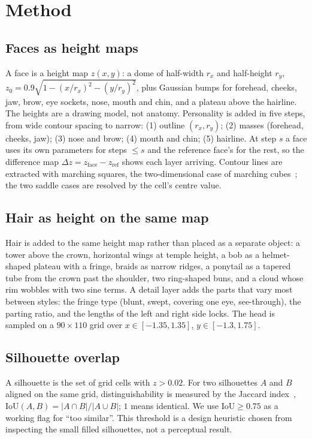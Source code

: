 \documentclass[11pt]{article}
\begin{document}
\section{Method}
\subsection{Faces as height maps}
A face is a height map $z(x,y)$: a dome of half-width $r_x$ and half-height $r_y$, $z_0 = 0.9\sqrt{1 - (x/r_x)^2 - (y/r_y)^2}$, plus Gaussian bumps for forehead, cheeks, jaw, brow, eye sockets, nose, mouth and chin, and a plateau above the hairline.
The heights are a drawing model, not anatomy.
Personality is added in five steps, from wide contour spacing to narrow: (1) outline $(r_x, r_y)$; (2) masses (forehead, cheeks, jaw); (3) nose and brow; (4) mouth and chin; (5) hairline.
At step $s$ a face uses its own parameters for steps $\le s$ and the reference face's for the rest, so the difference map $\Delta z = z_\text{face} - z_\text{ref}$ shows each layer arriving.
Contour lines are extracted with marching squares, the two-dimensional case of marching cubes~\cite{lorensen1987}; the two saddle cases are resolved by the cell's centre value.

\subsection{Hair as height on the same map}
Hair is added to the same height map rather than placed as a separate object: a tower above the crown, horizontal wings at temple height, a bob as a helmet-shaped plateau with a fringe, braids as narrow ridges, a ponytail as a tapered tube from the crown past the shoulder, two ring-shaped buns, and a cloud whose rim wobbles with two sine terms.
A detail layer adds the parts that vary most between styles: the fringe type (blunt, swept, covering one eye, see-through), the parting ratio, and the lengths of the left and right side locks.
The head is sampled on a $90\times110$ grid over $x\in[-1.35,1.35]$, $y\in[-1.3,1.75]$.

\subsection{Silhouette overlap}
A silhouette is the set of grid cells with $z > 0.02$.
For two silhouettes $A$ and $B$ aligned on the same grid, distinguishability is measured by the Jaccard index~\cite{jaccard1912}, $\mathrm{IoU}(A,B) = |A\cap B| / |A\cup B|$; $1$ means identical.
We use $\mathrm{IoU} \ge 0.75$ as a working flag for ``too similar''.
This threshold is a design heuristic chosen from inspecting the small filled silhouettes, not a perceptual result.
\end{document}
